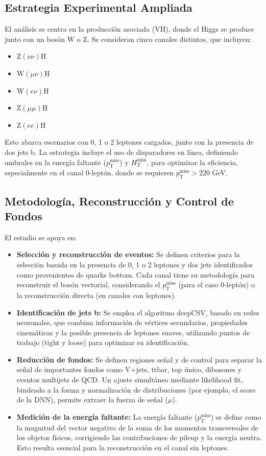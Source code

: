 \documentclass[a4paper,11pt]{article}
\begin{document}
\subsection*{Estrategia Experimental Ampliada}
El análisis se centra en la producción asociada (VH), donde el Higgs se produce junto con un bosón W o Z. Se consideran cinco canales distintos, que incluyen:
\begin{itemize}
    \item Z$(\nu\nu)$H
    \item W$(\mu\nu)$H
    \item W$(e\nu)$H
    \item Z$(\mu\mu)$H
    \item Z$(ee)$H
\end{itemize}
Esto abarca escenarios con 0, 1 o 2 leptones cargados, junto con la presencia de dos jets b. La estrategia incluye el uso de disparadores en línea, definiendo umbrales en la energía faltante ($p_{\text{T}}^{\text{miss}}$) y $H_{\text{T}}^{\text{miss}}$, para optimizar la eficiencia, especialmente en el canal 0-leptón, donde se requieren $p_{\text{T}}^{\text{miss}} > 220$ GeV.

\subsection*{Metodología, Reconstrucción y Control de Fondos}
El estudio se apoya en:
\begin{itemize}
    \item \textbf{Selección y reconstrucción de eventos:}  
    Se definen criterios para la selección basada en la presencia de 0, 1 o 2 leptones y dos jets identificados como provenientes de quarks bottom. Cada canal tiene su metodología para reconstruir el bosón vectorial, considerando el $p_{\text{T}}^{\text{miss}}$ (para el caso 0-leptón) o la reconstrucción directa (en canales con leptones).

    \item \textbf{Identificación de jets b:}  
    Se emplea el algoritmo deepCSV, basado en redes neuronales, que combina información de vértices secundarios, propiedades cinemáticas y la posible presencia de leptones suaves, utilizando puntos de trabajo (tight y loose) para optimizar su identificación.

    \item \textbf{Reducción de fondos:}  
    Se definen regiones señal y de control para separar la señal de importantes fondos como V+jets, ttbar, top único, dibosones y eventos multijets de QCD. Un ajuste simultáneo mediante likelihood fit, bindeado a la forma y normalización de distribuciones (por ejemplo, el score de la DNN), permite extraer la fuerza de señal ($\mu$).

    \item \textbf{Medición de la energía faltante:}  
    La energía faltante ($p_{\text{T}}^{\text{miss}}$) se define como la magnitud del vector negativo de la suma de los momentos transversales de los objetos físicos, corrigiendo las contribuciones de pileup y la energía neutra. Esto resulta esencial para la reconstrucción en el canal sin leptones.
\end{itemize}
\end{document}
